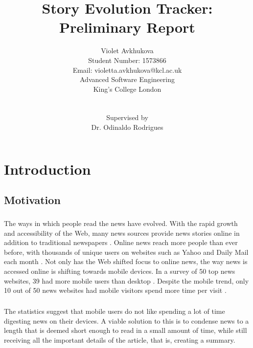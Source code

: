 \documentclass[11pt,titlepage]{report}
\begin{document}
\title{Story Evolution Tracker: Preliminary Report}
\author{Violet Avkhukova\\Student Number: 1573866\\Email: violetta.avkhukova@kcl.ac.uk\\Advanced Software Engineering\\King's College London\\\\\\Supervised by\\Dr. Odinaldo Rodrigues\\}
\maketitle

\lstset{basicstyle=\ttfamily, breaklines=true}
\setlength{\parskip}{-0.5em}

\chapter{Introduction}
\section{Motivation}
\paragraph{}
The ways in which people read the news have evolved. With the rapid growth and accessibility of the Web, many news sources provide news stories online in addition to traditional newspapers \cite{alipes}. Online news reach more people than ever before, with thousands of unique users on websites such as Yahoo and Daily Mail each month \cite{digital_trends}. Not only has the Web shifted focus to online news, the way news is accessed online is shifting towards mobile devices. In a survey of 50 top news websites, 39 had more mobile users than desktop \cite{digital_trends}. Despite the mobile trend, only 10 out of 50 news websites had mobile visitors spend more time per visit \cite{state_of_news}.
\paragraph{}
The statistics suggest that mobile users do not like spending a lot of time digesting news on their devices. A viable solution to this is to condense news to a length that is deemed short enough to read in a small amount of time, while still receiving all the important details of the article, that is, creating a summary.
\end{document}
